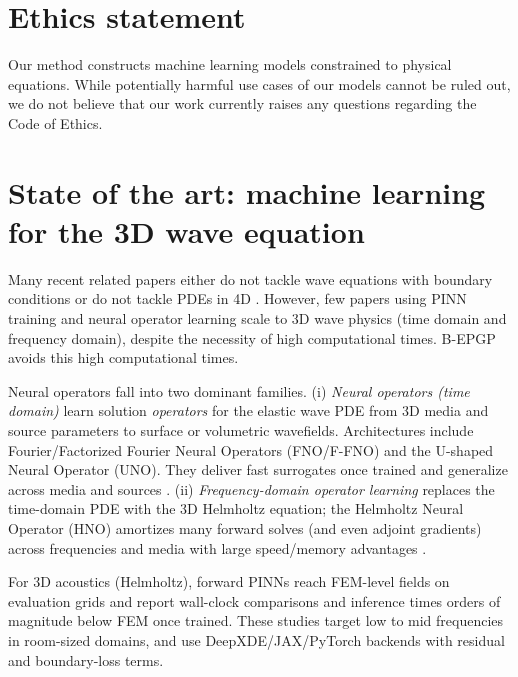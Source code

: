 \documentclass{article} %
\theoremstyle{plain}
\theoremstyle{definition}
\theoremstyle{remark}
\begin{document}
\section{Ethics statement}
Our method constructs machine learning models constrained to physical equations. While potentially harmful use cases of our models cannot be ruled out, we do not believe that our work currently raises any questions regarding the Code of Ethics.









\newpage
\appendix

\section{State of the art: machine learning for the 3D wave equation}
\label{sec:wave_sota}

Many recent related papers either do not tackle wave equations with boundary conditions \citep{henderson2023wave} or do not tackle PDEs in 4D \citep{raonic2024convolutional}. 
However, few papers using PINN training and neural operator learning scale to 3D wave physics (time domain and frequency domain), despite the necessity of high computational times. B-EPGP avoids this high computational times.

Neural operators fall into two dominant families.
(i) \emph{Neural operators (time domain)} learn solution \emph{operators} for the elastic wave PDE from 3D media and source parameters to surface or volumetric wavefields. Architectures include Fourier/Factorized Fourier Neural Operators (FNO/F-FNO) and the U-shaped Neural Operator (UNO). They deliver fast surrogates once trained and generalize across media and sources \citep{Lehmann2023UNO,Lehmann2024FFNO}. (ii) \emph{Frequency-domain operator learning} replaces the time-domain PDE with the 3D Helmholtz equation; the Helmholtz Neural Operator (HNO) amortizes many forward solves (and even adjoint gradients) across frequencies and media with large speed/memory advantages \citep{Zou2024HNO}.

For 3D acoustics (Helmholtz), forward PINNs reach FEM-level fields on evaluation grids \citep{Schoder2024PINN,Schoder2025MDPI} and report wall-clock comparisons and inference times orders of magnitude below FEM once trained. These studies target low to mid frequencies in room-sized domains, and use DeepXDE/JAX/PyTorch backends with residual and boundary-loss terms.
\end{document}
